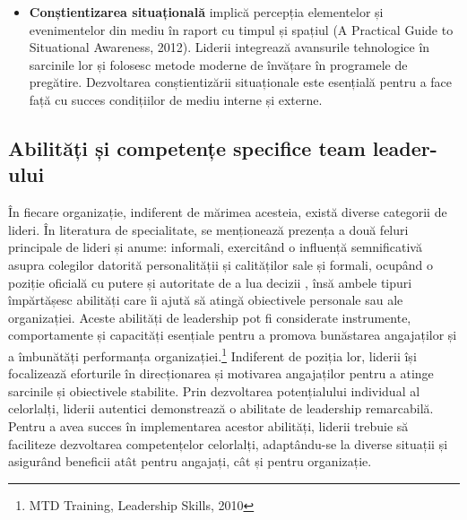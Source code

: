 \documentclass[a4paper, 12pt]{article}
\begin{document}
\begin{itemize}
	\item \textbf{Conștientizarea situațională} implică percepția elementelor și evenimentelor din mediu în raport cu timpul și spațiul (A Practical Guide to Situational Awareness, 2012). Liderii integrează avansurile tehnologice în sarcinile lor și folosesc metode moderne de învățare în programele de pregătire. Dezvoltarea conștientizării situaționale este esențială pentru a face față cu succes condițiilor de mediu interne și externe. 

	\end{itemize}

	\subsection{Abilități și competențe specifice team leader-ului}
	
	\quad\quad În fiecare organizație, indiferent de mărimea acesteia, există diverse categorii de lideri. În literatura de specialitate, se menționează prezența a două feluri principale de lideri și anume: informali, exercitând o influență semnificativă asupra colegilor datorită personalității și calităților sale și formali, ocupând o poziție oficială cu putere și autoritate de a lua decizii , însă ambele tipuri împărtășesc abilități care îi ajută să atingă obiectivele personale sau ale organizației. Aceste abilități de leadership pot fi considerate instrumente, comportamente și capacități esențiale pentru a promova bunăstarea angajaților și a îmbunătăți performanța organizației.\footnote{MTD Training, Leadership Skills, 2010} Indiferent de poziția lor, liderii își focalizează eforturile în direcționarea și motivarea angajaților pentru a atinge sarcinile și obiectivele stabilite. Prin dezvoltarea potențialului individual al celorlalți, liderii autentici demonstrează o abilitate de leadership remarcabilă. Pentru a avea succes în implementarea acestor abilități, liderii trebuie să faciliteze dezvoltarea competențelor celorlalți, adaptându-se la diverse situații și asigurând beneficii atât pentru angajați, cât și pentru organizație.
\end{document}
